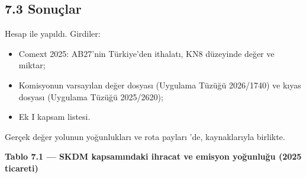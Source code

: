 \hypertarget{02c_hazirlik-73-sonuuxe7lar}{%
\subsection{7.3 Sonuçlar}\label{02c_hazirlik-73-sonuuxe7lar}}

Hesap  ile yapıldı. Girdiler:

\begin{itemize}
\tightlist
\item
  Comext 2025: AB27'nin Türkiye'den ithalatı, KN8 düzeyinde değer ve miktar;
\item
  Komisyonun varsayılan değer dosyası (Uygulama Tüzüğü 2026/1740) ve kıyas dosyası (Uygulama Tüzüğü 2025/2620);
\item
  Ek I kapsam listesi.
\end{itemize}

Gerçek değer yolunun yoğunlukları ve rota payları 'de, kaynaklarıyla birlikte.


\textbf{Tablo 7.1 --- SKDM kapsamındaki ihracat ve emisyon yoğunluğu (2025 ticareti)}

\nopagebreak[4]

\begingroup\gbtablo\footnotesize


